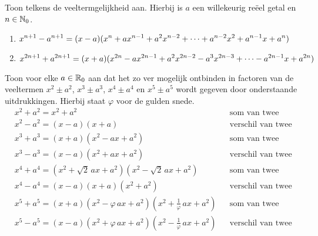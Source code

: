 \documentclass{ximera}
\begin{document}
\begin{Uitbreiding}
\begin{exercise}
Toon telkens de veeltermgelijkheid aan. Hierbij is $a$ een willekeurig reëel getal en $n \in \mathbb{N}_0$.
\begin{enumerate}

\item
$\displaystyle x^{n+1} - a^{n+1} = (x-a)(x^{n} + ax^{n-1} + a^2x^{n-2} + \dots + a^{n-2}x^2 + a^{n-1}x + a^{n})$
\item
$\displaystyle x^{2n+1} + a^{2n+1} = (x+a)(x^{2n} - ax^{2n-1} + a^2x^{2n-2} - a^3x^{2n-3} + \dots - a^{2n-1}x + a^{2n})$
\end{enumerate}
\end{exercise}

\begin{exercise}
\label{somtweevierdemachten}
Toon voor elke $a \in \mathbb{R}_0$ aan dat het zo ver mogelijk ontbinden in factoren van de veeltermen $x^2 \pm a^2$, $x^3 \pm a^3$, $x^4 \pm a^4$ en  $x^5 \pm a^5$ wordt gegeven door onderstaande uitdrukkingen. Hierbij staat $\varphi$ voor de gulden snede. %
\begin{align*}
& x^2 + a^2 = x^2 + a^2 && \text{som van twee kwadraten} \\
& x^2 - a^2 = (x-a)(x+a) && \text{verschil van twee kwadraten} \\
& x^3 + a^3 = (x+a)(x^2 - ax + a^2) && \text{som van twee derde machten} \\
& x^3 - a^3 = (x-a)(x^2 + ax + a^2) && \text{verschil van twee derde machten} \\
& x^4 + a^4 = (x^2 + \sqrt{2}\,ax + a^2)(x^2 - \sqrt{2}\,ax + a^2) && \text{som van twee vierde machten} \\
& x^4 - a^4 = (x-a)(x+a)(x^2+a^2) && \text{verschil van twee vierde machten} \\
& x^5 + a^5 = (x+a)(x^2-\varphi\,ax + a^2)(x^2+\frac{1}{\varphi}\,ax + a^2) && \text{som van twee vijfde machten} \\
& x^5 - a^5 = (x-a)(x^2+\varphi\,ax + a^2)(x^2-\frac{1}{\varphi}\,ax + a^2) && \text{verschil van twee vijfde machten}
\end{align*}
\end{exercise}


\end{Uitbreiding}
\end{document}
